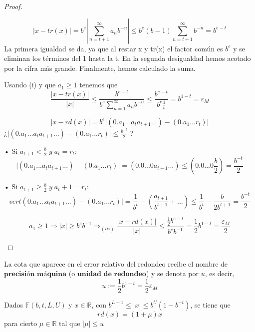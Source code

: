 \begin{proof}
$ $
	\begin{nlist}
	\item 
	\[ \vert x - tr(x) \vert = b^e \left\vert \sum_{n=t+1}^{\infty} a_nb^{-n} \right\vert \leq b^e(b-1) \sum_{n=t+1}^{\infty} b^{-n} = b^{e-t} \]
	La primera igualdad se da, ya que al restar x y tr(x) el factor común es $b^e$ y se eliminan los términos del 1 hasta la t. En la segunda desigualdad hemos acotado por la cifra más grande. Finalmente, hemos calculado la suma.
	\item Usando (i) y que $a_1 \geq 1$ tenemos que 
	\[ \frac{\vert x - tr(x) \vert}{\vert x \vert} \leq \frac{b^{e-t}}{b^e \sum_{n=1}^{\infty} a_nb^{-n}} \leq \frac{b^{e-t}}{b^e \frac{1}{b}} = b^{1-t} = \varepsilon _M \]
	\item 
	\[ \vert x - rd(x) \vert = b^e \vert (0.a_1...a_ta_{t+1}...) - (0.a_1...r_t) \vert \]
	 ¿$ \vert (0.a_1...a_ta_{t+1}...) - (0.a_1...r_t) \vert \leq \frac{b^{-t}}{2}$ ?
		\item[•] Si $a_{t+1} < \frac{b}{2} \; y \; a_t = r_t$:
		\[ \vert (0.a_1...a_ta_{t+1}...) - (0.a_1...r_t) \vert = (0.0...0a_{t+1}...) \leq (0.0...0 \frac{b}{2}) = \frac{b^{-t}}{2} \]
		\item[•] Si $a_{t+1} \geq \frac{b}{2} \; y \; a_t + 1 = r_t$:
		\[ vert (0.a_1...a_ta_{t+1}...) - (0.a_1...r_t) \vert = \frac{1}{b^t} - \left( \frac{a_{t+1}}{b^{t+1}} + ... \right) \leq \frac{1}{b^t} - \frac{b}{2b^{t+1}} = \frac{b^{-t}}{2} \]
	\item \[ a_1 \geq 1 \Rightarrow \vert x \vert \geq b^eb^{-1} \Rightarrow _{(iii)} \frac{\vert x - rd(x) \vert }{\vert x \vert} \leq \frac{\frac{1}{2}b^{e-t}}{b^eb^{-1}} = \frac{1}{2}b^{1-t} = \frac{\varepsilon _M}{2} \]
	\end{nlist}	
\end{proof}

\begin{ndef}
La cota que aparece en el error relativo del redondeo recibe el nombre de $\textbf{precisión máquina}$ (o $\textbf{unidad de redondeo}$) y se denota por $u$, es decir,
\[ u := \frac{1}{2}b^{1-t} = \frac{1}{2} \varepsilon _M \]
\end{ndef}

\begin{ncor}
Dados $\mathbb{F} (b,t,L,U)$ y $x \in \mathbb{R}$, con $b^{L-1} \leq \vert x \vert \leq b^U(1 - b^{-t})$, se tiene que
\[ rd(x) = (1 + \mu )x \]
para cierto $\mu \in \mathbb{R}$ tal que $\vert \mu \vert \leq u$
\end{ncor}

